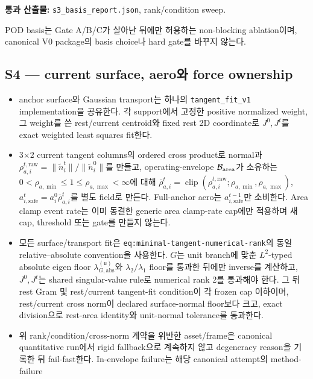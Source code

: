 \documentclass[10pt]{article}
\newcommand{\code}[1]{{\small\nolinkurl{#1}}}
\newcommand{\pass}[1]{\textcolor{GateGreen}{\textbf{#1}}}
\begin{document}
\pass{통과 산출물:} \code{s3\_basis\_report.json}, rank/condition sweep.

POD basis는 Gate A/B/C가 살아난 뒤에만 허용하는 non-blocking ablation이며,
canonical V0 package의 basis choice나 hard gate를 바꾸지 않는다.

\subsection{S4 --- current surface, aero와 force ownership}

\begin{itemize}
  \item [\(\square\)] anchor surface와 Gaussian transport는 하나의
  \code{tangent\_fit\_v1} implementation을 공유한다. 각 support에서 고정한
  positive normalized weight, 그 weight를 쓴 rest/current centroid와 fixed rest 2D coordinate로
  \(J^0,J^t\)를 exact weighted least squares fit한다.
  \item [\(\square\)] 3\(\times\)2 current tangent columns의 ordered cross product로
  normal과
  \(\rho_{a,i}^{t,\mathrm{raw}}=\|\widetilde n_i^t\|/\|\widetilde n_i^0\|\)를 만들고,
  operating-envelope \(\mathcal B_{\rm area}\)가 소유하는
  \(0<\rho_{a,\min}\leq1\leq\rho_{a,\max}<\infty\)에 대해
  \(\bar\rho_{a,i}^t=\operatorname{clip}(\rho_{a,i}^{t,\mathrm{raw}};
  \rho_{a,\min},\rho_{a,\max})\),
  \(a_{i,\mathrm{safe}}^t=a_i^0\bar\rho_{a,i}^t\)를 별도 field로 만든다.
  Full-anchor aero는 \(a_{i,\mathrm{safe}}^{t-1}\)만 소비한다.
  Area clamp event rate는 이미 동결한 generic area clamp-rate cap에만 적용하며
  새 cap, threshold 또는 gate를 만들지 않는다.
  \item [\(\square\)] 모든 surface/transport fit은
  \code{eq:minimal-tangent-numerical-rank}의 동일 relative--absolute convention을 사용한다.
  \(G\)는 unit branch에 맞춘 \(L^2\)-typed absolute eigen floor
  \(\lambda_{G,\mathrm{abs}}^{(\mathsf u)}\)와
  \(\lambda_2/\lambda_1\) floor를 통과한 뒤에만 inverse를 계산하고,
  \(J^0,J^t\)는 shared singular-value rule로 numerical rank 2를 통과해야 한다.
  그 뒤 rest Gram 및 rest/current tangent-fit condition이 각 frozen cap 이하이며,
  rest/current cross norm이 declared surface-normal floor보다 크고,
  exact division으로 rest-area identity와 unit-normal tolerance를 통과한다.
  \item [\(\square\)] 위 rank/condition/cross-norm 계약을 위반한 asset/frame은
  canonical quantitative run에서 rigid fallback으로 계속하지 않고 degeneracy reason을
  기록한 뒤 fail-fast한다. In-envelope failure는 해당 canonical attempt의 method-failure

\end{itemize}
\end{document}
